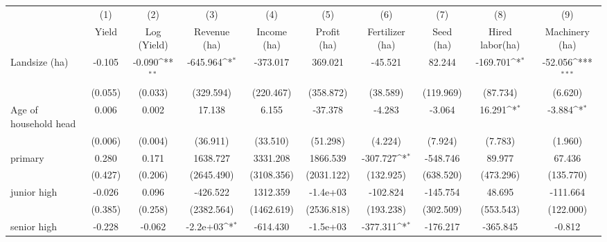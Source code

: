 {
\def\sym#1{\ifmmode^{#1}\else\(^{#1}\)\fi}
\begin{tabular}{l*{9}{c}}
\hline\hline
                    &\multicolumn{1}{c}{(1)}         &\multicolumn{1}{c}{(2)}         &\multicolumn{1}{c}{(3)}         &\multicolumn{1}{c}{(4)}         &\multicolumn{1}{c}{(5)}         &\multicolumn{1}{c}{(6)}         &\multicolumn{1}{c}{(7)}         &\multicolumn{1}{c}{(8)}         &\multicolumn{1}{c}{(9)}         \\
                    &Yield         &Log (Yield)         &Revenue (ha)         &Income (ha)         &Profit (ha)         &Fertilizer (ha)         &Seed (ha)         &Hired labor(ha)         &Machinery (ha)         \\
\hline
Landsize (ha)       &-0.105         &-0.090\sym{**} &-645.964\sym{*}  &-373.017         &369.021         &-45.521         &82.244         &-169.701\sym{*}  &-52.056\sym{***}\\
                    &(0.055)         &(0.033)         &(329.594)         &(220.467)         &(358.872)         &(38.589)         &(119.969)         &(87.734)         &(6.620)         \\
Age of household head&0.006         &0.002         &17.138         &6.155         &-37.378         &-4.283         &-3.064         &16.291\sym{*}  &-3.884\sym{*}  \\
                    &(0.006)         &(0.004)         &(36.911)         &(33.510)         &(51.298)         &(4.224)         &(7.924)         &(7.783)         &(1.960)         \\
primary             &0.280         &0.171         &1638.727         &3331.208         &1866.539         &-307.727\sym{*}  &-548.746         &89.977         &67.436         \\
                    &(0.427)         &(0.206)         &(2645.490)         &(3108.356)         &(2031.122)         &(132.925)         &(638.520)         &(473.296)         &(135.770)         \\
junior high         &-0.026         &0.096         &-426.522         &1312.359         &-1.4e+03         &-102.824         &-145.754         &48.695         &-111.664         \\
                    &(0.385)         &(0.258)         &(2382.564)         &(1462.619)         &(2536.818)         &(193.238)         &(302.509)         &(553.543)         &(122.000)         \\
senior high         &-0.228         &-0.062         &-2.2e+03\sym{*}  &-614.430         &-1.5e+03         &-377.311\sym{*}  &-176.217         &-365.845         &-0.812         \\

\end{tabular}}

